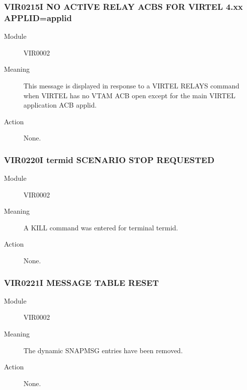 \documentclass[letterpaper,10pt,english]{sphinxmanual}
\begin{document}
\subsubsection{VIR0215I NO ACTIVE RELAY ACBS FOR VIRTEL 4.xx APPLID=applid}
\label{\detokenize{messages:vir0215i-no-active-relay-acbs-for-virtel-4-xx-applid-applid}}\begin{description}
\item[{Module}] \leavevmode
VIR0002

\item[{Meaning}] \leavevmode
This message is displayed in response to a VIRTEL RELAYS command when VIRTEL has no VTAM ACB open except for the main VIRTEL application ACB applid.

\item[{Action}] \leavevmode
None.

\end{description}


\subsubsection{VIR0220I termid SCENARIO STOP REQUESTED}
\label{\detokenize{messages:vir0220i-termid-scenario-stop-requested}}\begin{description}
\item[{Module}] \leavevmode
VIR0002

\item[{Meaning}] \leavevmode
A KILL command was entered for terminal termid.

\item[{Action}] \leavevmode
None.

\end{description}


\subsubsection{VIR0221I MESSAGE TABLE RESET}
\label{\detokenize{messages:vir0221i-message-table-reset}}\begin{description}
\item[{Module}] \leavevmode
VIR0002

\item[{Meaning}] \leavevmode
The dynamic SNAPMSG entries have been removed.

\item[{Action}] \leavevmode
None.

\end{description}
\end{document}

